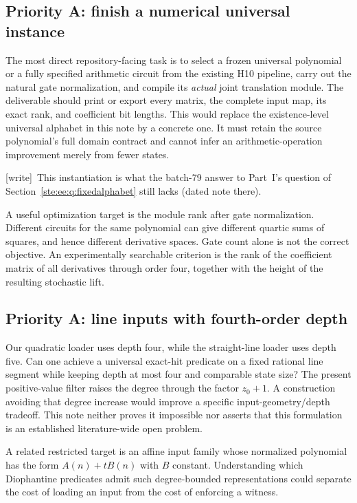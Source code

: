\documentclass[11pt,letterpaper]{article}
\theoremstyle{definition}
\theoremstyle{remark}
\newcommand{\wtag}{\textup{[write]}}
\begin{document}
\subsection{Priority A: finish a numerical universal instance}\label{ste:mx:q:instantiate}

The most direct repository-facing task is to select a frozen universal
polynomial or a fully specified arithmetic circuit from the existing H10
pipeline, carry out the natural gate normalization, and compile its \emph{actual}
joint translation module. The deliverable should print or export every matrix,
the complete input map, its exact rank, and coefficient bit lengths. This would
replace the existence-level universal alphabet in this note by a concrete one.
It must retain the source polynomial's full domain contract and cannot infer
an arithmetic-operation improvement merely from fewer states.

\wtag\ This instantiation is what the batch-79 answer to Part~I's question of Section~\ref{ste:ee:q:fixedalphabet} still lacks (dated note there).

A useful optimization target is the module rank after gate normalization.
Different circuits for the same polynomial can give different quartic sums of
squares, and hence different derivative spaces. Gate count alone is not the
correct objective. An experimentally searchable criterion is the rank of the
coefficient matrix of all derivatives through order four, together with the
height of the resulting stochastic lift.

\subsection{Priority A: line inputs with fourth-order depth}\label{ste:mx:q:line}

Our quadratic loader uses depth four, while the straight-line loader uses
depth five. Can one achieve a universal exact-hit predicate on a fixed rational
line segment while keeping depth at most four and comparable state size?
The present positive-value filter raises the degree through the factor $z_0+1$.
A construction avoiding that degree increase would improve a specific
input-geometry/depth tradeoff. This note neither proves it impossible nor
asserts that this formulation is an established literature-wide open problem.

A related restricted target is an affine input family whose normalized
polynomial has the form $A(n)+tB(n)$ with $B$ constant. Understanding which
Diophantine predicates admit such degree-bounded representations could separate
the cost of loading an input from the cost of enforcing a witness.
\end{document}
